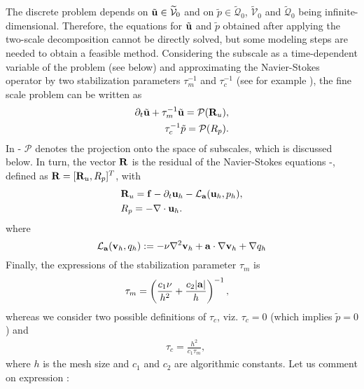 The discrete problem depends on $\tilde{{\bf u}} \in \widetilde{\mathcal{V}}_0$ and on $\tilde{p}\in \widetilde{\mathcal{Q}}_0$,  $\widetilde{\mathcal{V}}_0$ and $\widetilde{\mathcal{Q}}_0$ being infinite-dimensional. Therefore, the equations for $\tilde{{\bf u}}$ and $\tilde{p}$ obtained after applying the two-scale decomposition cannot be directly solved, but some modeling steps are needed to obtain a feasible method. Considering the subscale as a time-dependent variable of the problem (see below) and approximating the Navier-Stokes operator by two stabilization parameters $\tau_m^{-1}$ and $\tau_c^{-1}$ (see for example \cite{codina_time_2007}), the fine scale problem can be written as
\begin{align}
\label{eq-C2_velo_sgs}
\partial_t\tilde{{\bf u}}+\tau_m^{-1}\tilde{{\bf u}}=\mathcal{P}({\bf R}_u),\\
\label{eq-C2_press_sgs}
\tau_c^{-1}\tilde{p}=\mathcal{P}(R_p).
\end{align}
In - $\mathcal{P}$ denotes the projection onto the space of subscales, which is discussed below. In turn, the vector ${\bf R}$ is the residual of the Navier-Stokes equations -, defined as ${\bf R}=[{\bf R}_u,R_p]^T$, with
\begin{align}
\label{eq-C2_Ru}
&{\bf R}_u={\bf f}-\partial_t{\bf u}_h-\mathcal{L}_{{\bf a}}({\bf u}_h,p_h),\\
\label{eq-C2_Rp}
&R_p=-\nabla\cdot{\bf u}_h.
\end{align}
where
\begin{equation}
\label{eq-C2_operator}
\mathcal{L}_{{\bf a}}({\bf v}_h,q_h):=-\nu\nabla^2{\bf v}_h+{\bf a}\cdot\nabla{\bf v}_h+\nabla q_h
\end{equation}
Finally, the expressions of the stabilization parameter $\tau_m$ is 
\begin{align}
\label{eq-C2_tau_m}
&\tau_m=\left(\frac{c_1\nu}{h^2}+\frac{c_2|{\bf a}|}{h}\right)^{-1},
\end{align}
whereas we consider two possible definitions of $\tau_c$, viz. $\tau_c = 0$ (which implies $\tilde{p} = 0$) and 
\begin{align}
\label{eq-C2_tau_c}
&\tau_c=\frac{h^2}{c_1\tau_m},
\end{align}
where $h$ is the mesh size and $c_1$ and $c_2$ are algorithmic constants. Let us comment on expression :
